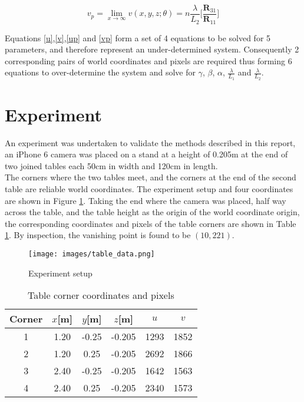 \documentclass[12pt]{article}
\newcommand{\mtx}[1]{\ensuremath{\mathbf{#1}}}
\begin{document}
\begin{equation}\label{vp}
v_p = \lim_{x\to\infty} v(x,y,z;\theta) = n\frac{\lambda}{L_2}
\bigg[\frac{\mtx{R}_{31}}
{\mtx{R}_{11}} \bigg]
\end{equation}

Equations \ref{u},\ref{v},\ref{up} and \ref{vp} form a set of 4 equations to be solved for 5 parameters, and therefore represent an under-determined system. Consequently 2 corresponding pairs of world coordinates and pixels are required thus forming 6 equations to over-determine the system and solve for $\gamma$, $\beta$, $\alpha$, $\frac{\lambda}{L_1}$ and $\frac{\lambda}{L_2}$.


\section{Experiment}

An experiment was undertaken to validate the methods described in this report, an iPhone 6 camera was placed on a stand at a height of 0.205m at the end of two joined tables each 50cm in width and 120cm in length.\\

The corners where the two tables meet, and the corners at the end of the second table are reliable world coordinates. The experiment setup and four coordinates are shown in Figure \ref{fig:experiment}. Taking the end where the camera was placed, half way across the table, and the table height as the origin of the world coordinate origin, the corresponding coordinates and pixels of the table corners are shown in Table \ref{table:1}. By inspection, the vanishing point is found to be $(10,221)$. 
\newline

\begin{figure}[h]
\centering
\texttt{[image: images/table\_data.png]}
\caption{Experiment setup}\label{fig:experiment}
\end{figure}

\begin{table}[!htb]
\begin{center}
\begin{tabular}{ |c|c|c|c|c|c| } 
\hline
Corner & $x$[m] & $y$[m] & $z$[m] &$u$ & $v$\\
\hline
1 & 1.20 & -0.25  &-0.205 & 1293 & 1852 \\
2 & 1.20 &  0.25 &  -0.205 & 2692 & 1866 \\
3 & 2.40 & -0.25 & -0.205 & 1642 & 1563 \\
4 & 2.40 & 0.25 & -0.205 & 2340 & 1573\\
\hline
\end{tabular}
\end{center}
\caption{Table corner coordinates and pixels}
\label{table:1}
\end{table}
\end{document}
